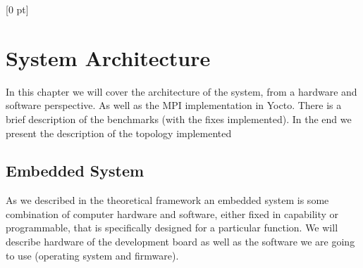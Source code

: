 \titlespacing{\chapter}{0 pt}{30 pt}{50 pt}[0 pt]
\titleformat{\section}{\Large\bfseries}{\thesection}{0 pt}{\hspace{30 pt}}
\titleformat{\subsection}{\large\bfseries}{\thesubsection}{0 pt}{\hspace{30 pt}}
\pagestyle{fancy}
\fancyhead[LO,LE]{\footnotesize\emph{\leftmark}}
\fancyhead[RO,RE]{\thepage}
\fancyfoot[CO,CE]{}

\chapter{System Architecture}

\normalsize
\noindent
In this chapter we will cover the architecture of the system, from a hardware
and software perspective. As well as the MPI implementation in Yocto. There is
a brief description of the benchmarks (with the fixes implemented). In the end
we present the description of the topology implemented

\section{Embedded System}
\noindent

As we described in the theoretical framework an embedded system is some
combination of computer hardware and software, either fixed in capability or
programmable, that is specifically designed for a particular function. We will
describe hardware of the development board as well as the software we are going
to use (operating system and firmware).

